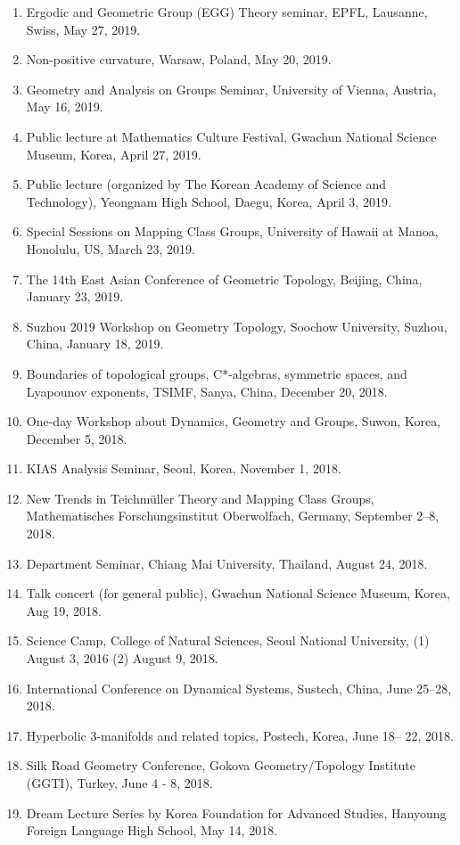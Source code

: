 \documentclass[11pt,a4paper]{article}
\begin{document}
\begin{enumerate}[leftmargin=1.5em, label=\arabic*.]
\item Ergodic and Geometric Group (EGG) Theory seminar, EPFL, Lausanne, Swiss, May 27, 2019.
\item Non-positive curvature, Warsaw, Poland, May 20, 2019.
\item Geometry and Analysis on Groups Seminar, University of Vienna, Austria, May 16, 2019.
\item Public lecture at Mathematics Culture Festival, Gwachun National Science Museum, Korea, April 27, 2019.
\item Public lecture (organized by The Korean Academy of Science and Technology), Yeongnam High School, Daegu, Korea, April 3, 2019.
\item Special Sessions on Mapping Class Groups, University of Hawaii at Manoa, Honolulu, US, March 23, 2019.
\item The 14th East Asian Conference of Geometric Topology, Beijing, China, January 23, 2019.
\item Suzhou 2019 Workshop on Geometry Topology, Soochow University, Suzhou, China, January 18, 2019.
\item Boundaries of topological groups, C*-algebras, symmetric spaces, and Lyapounov exponents, TSIMF, Sanya, China, December 20, 2018.
\item One-day Workshop about Dynamics, Geometry and Groups, Suwon, Korea, December 5, 2018.
\item KIAS Analysis Seminar, Seoul, Korea, November 1, 2018.
\item New Trends in Teichmüller Theory and Mapping Class Groups, Mathematisches Forschungsinstitut Oberwolfach, Germany, September 2--8, 2018.
\item Department Seminar, Chiang Mai University, Thailand, August 24, 2018.
\item Talk concert (for general public), Gwachun National Science Museum, Korea, Aug 19, 2018.
\item Science Camp, College of Natural Sciences, Seoul National University, (1) August 3, 2016 (2) August 9, 2018.
\item International Conference on Dynamical Systems, Sustech, China, June 25--28, 2018.
\item Hyperbolic 3-manifolds and related topics, Postech, Korea, June 18-- 22, 2018.
\item Silk Road Geometry Conference, Gokova Geometry/Topology Institute (GGTI), Turkey, June 4 - 8, 2018.
\item Dream Lecture Series by Korea Foundation for Advanced Studies, Hanyoung Foreign Language High School, May 14, 2018.

\end{enumerate}
\end{document}
